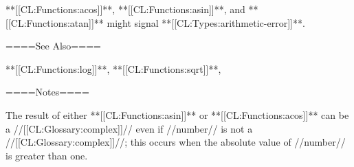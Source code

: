 **[[CL:Functions:acos]]**, **[[CL:Functions:asin]]**, and **[[CL:Functions:atan]]** might signal **[[CL:Types:arithmetic-error]]**.

====See Also====

**[[CL:Functions:log]]**, **[[CL:Functions:sqrt]]**, {\secref\FloatSubstitutability}

====Notes====

The result of either **[[CL:Functions:asin]]** or **[[CL:Functions:acos]]** can be a //[[CL:Glossary:complex]]// even if //number// is not a //[[CL:Glossary:complex]]//; this occurs when the absolute value of //number// is greater than one.

       
